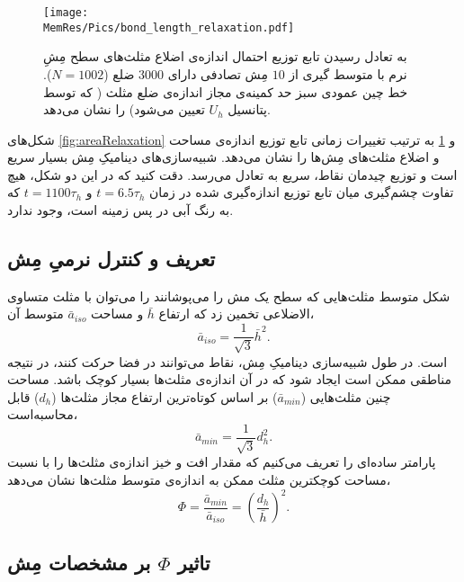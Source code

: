 \begin{figure}[htbp]
\begin{center}
\texttt{[image: \\MemRes/Pics/bond\_length\_relaxation.pdf]}
\caption{
به تعادل رسیدن تابع توزیع احتمال اندازه‌ی اضلاع مثلث‌های سطح مِشِ نرم با متوسط گیری از 
$10$
 مِش‌ تصادفی دارای
$3000$
ضلع 
($N=1002$). خط چین عمودی سبز حد کمینه‌ی مجاز اندازه‌ی ضلع مثلث ( که توسط پتانسیل
$U_h$
تعیین می‌شود) را نشان می‌دهد.
}
\label{fig:bondRelaxation}
\end{center}
\end{figure}

شکل‌های 
\ref{fig:areaRelaxation}
و
\ref{fig:bondRelaxation}
به ترتیب تغییرات زمانی تابع توزیع اندازه‌ی مساحت و اضلاع مثلث‌های مِش‌ها را نشان می‌دهد. شبیه‌سازی‌های دینامیکِ مِش بسیار سریع است و توزیع چیدمان نقاط، سریع به تعادل می‌رسد. دقت کنید که در این دو شکل، هیچ تفاوت چشم‌گیری میان تابع توزیع اندازه‌گیری شده در زمان
$t=6.5 \tau_h$
و
$t=1100 \tau_h$
که به رنگ آبی در پس زمینه است، وجود ندارد.

\subsection{\label{sec:phi}
تعریف و کنترل نرمیِ مِش
}

شکل متوسط مثلث‌هایی که سطح یک مش را می‌پوشانند را می‌توان با مثلث متساوی الاضلاعی تخمین زد که ارتفاع 
$\bar h$
و مساحت 
$\bar a_{iso}$
متوسط آن،
\begin{equation}
\bar a_{iso}=\frac{1}{\sqrt{3}}\bar h^2.
\label{eq:averageTriArea}
\end{equation}
است. در طول شبیه‌سازی دینامیکِ مِش، نقاط می‌توانند در فضا حرکت کنند، در نتیجه مناطقی ممکن است ایجاد شود که در آن اندازه‌ی مثلث‌ها بسیار کوچک باشد. مساحت چنین مثلث‌هایی 
($\bar a_{min}$)
بر اساس کوتاه‌ترین ارتفاع مجاز مثلث‌ها
($d_h$)
قابل محاسبه‌است،
\begin{equation}
\bar a_{min}=\frac{1}{\sqrt{3}}d_h^2.
\label{eq:aMin}
\end{equation}
پارامتر ساده‌ای را تعریف می‌کنیم که مقدار افت و خیز اندازه‌ی مثلث‌ها را با نسبت مساحت کوچکترین مثلث ممکن به اندازه‌ی متوسط مثلث‌ها نشان می‌دهد،
\begin{equation}\label{eq:Phi}
\Phi=\frac{\bar a_{min}}{\bar a_{iso}}=\left(\frac{d_h}{\bar h}\right)^2.
\end{equation}
\subsection{\label{sec:AreaVertex}
تاثیر
$\Phi$
بر مشخصات مِش
}

